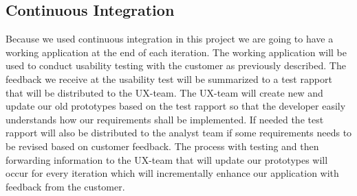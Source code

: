 \subsection{Continuous Integration}
Because we used continuous integration in this project we are going to have a working application at the end of each iteration. The working application will be used to conduct usability testing with the customer as previously described. The feedback we receive at the usability test will be summarized to a test rapport that will be distributed to the UX-team. The UX-team will create new and update our old prototypes based on the test rapport so that the developer easily understands how our requirements shall be implemented. If needed the test rapport will also be distributed to the analyst team if some requirements needs to be revised based on customer feedback. The process with testing and then forwarding information to the UX-team that will update our prototypes will occur for every iteration which will incrementally enhance our application with feedback from the customer.